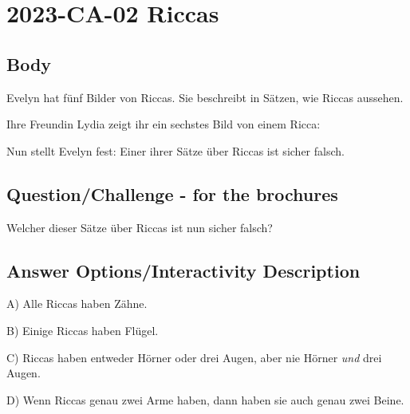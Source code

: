 \documentclass[a4paper,11pt]{report}
\newcommand{\taskGraphicsFolder}{..}
\begin{document}
\section*{\centering{} 2023-CA-02 Riccas}


\subsection*{Body}

Evelyn hat fünf Bilder von Riccas. Sie beschreibt in Sätzen, wie Riccas aussehen.

\raisebox{-0.5ex}{}
\raisebox{-0.5ex}{}
\raisebox{-0.5ex}{}
\raisebox{-0.5ex}{}
\raisebox{-0.5ex}{}

Ihre Freundin Lydia zeigt ihr ein sechstes Bild von einem Ricca:

{\centering%
\par}

Nun stellt Evelyn fest: Einer ihrer Sätze über Riccas ist sicher falsch.

{\em


\subsection*{Question/Challenge - for the brochures}

Welcher dieser Sätze über Riccas ist nun sicher falsch?

}

\begingroup
\renewcommand{\arraystretch}{1.5}
\subsection*{Answer Options/Interactivity Description}

A) Alle Riccas haben Zähne.

B) Einige Riccas haben Flügel.

C) Riccas haben entweder Hörner oder drei Augen, aber nie Hörner \emph{und} drei Augen.

D) Wenn Riccas genau zwei Arme haben, dann haben sie auch genau zwei Beine.
\end{document}
